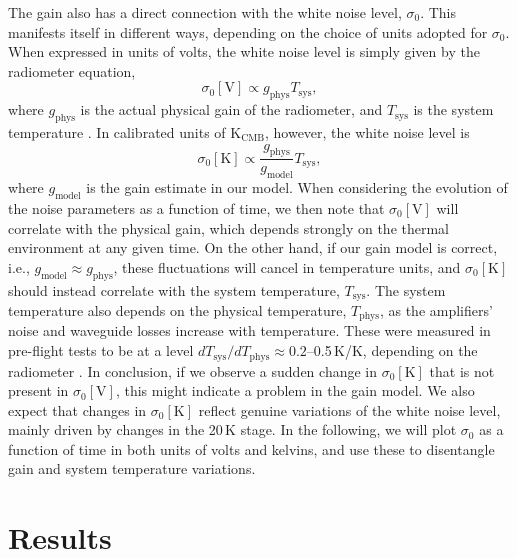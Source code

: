 \documentclass[twocolumn]{aa}
\begin{document}
The gain also has a direct connection with the white noise level,
$\sigma_0$. This manifests itself in different ways, depending on the
choice of units adopted for $\sigma_0$. When expressed in units of
volts, the white noise level is simply given by the radiometer
equation,
\begin{equation}
	\sigma_0 [\mathrm{V}] \propto g_\mathrm{phys} T_\mathrm{sys},
\end{equation}
where $g_\mathrm{phys}$ is the actual physical gain of the radiometer,
and $T_\mathrm{sys}$ is the system temperature \citep{bp01}. In
calibrated units of $\mathrm{K}_{\mathrm{CMB}}$, however, the white
noise level is
\begin{equation}
	\sigma_0 [\mathrm{K}] \propto \frac{g_\mathrm{phys} }{g_\mathrm{model}}T_\mathrm{sys},
\end{equation}
where $g_\mathrm{model}$ is the gain estimate in our model. When
considering the evolution of the noise parameters as a function of
time, we then note that $\sigma_0 [\mathrm{V}]$ will correlate with
the physical gain, which depends strongly on the thermal environment
at any given time. 
On the other hand, if our gain model is correct, i.e.,
$g_{\mathrm{model}}\approx g_{\mathrm{phys}}$, these fluctuations
will cancel in temperature units, and $\sigma_0 [\mathrm{K}]$ should
instead correlate with
the system temperature, $T_\mathrm{sys}$. The system temperature also
depends on the physical temperature, $T_{\mathrm{phys}}$, as the amplifiers' noise and waveguide losses increase with temperature. These were measured in pre-flight tests to be at a level
${dT_{\mathrm{sys}} / dT_{\mathrm{phys}} } \approx 0.2$--0.5\,K/K, depending on
the radiometer \citep{terenzi2009b}.
In conclusion, if we observe a sudden change in $\sigma_0 [\mathrm{K}]$ that is not present in $\sigma_0 [\mathrm{V}]$, this might indicate a problem in the gain model. We also expect that changes in $\sigma_0 [\mathrm{K}]$ reflect genuine variations of the white noise level, mainly driven by changes in the 20\,K stage.
In the following, we will plot $\sigma_0$ as a function
of time in both units of volts and kelvins, and use these to
disentangle gain and system temperature variations.

\section{Results}
\label{sec:results}
\end{document}
